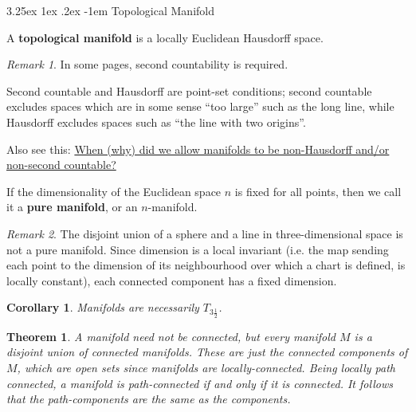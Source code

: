\documentclass[12pt, letterpaper]{article}
\makeatletter
\newtheorem{cor}[prop]{Corollary}
\newtheorem{thm}[prop]{Theorem}
\renewcommand\paragraph{\@startsection{paragraph}{4}{\z@}%
	{3.25ex \@plus1ex \@minus.2ex}%
	{-1em}%
	{\normalfont\normalsize\bfseries}}
\theoremstyle{definition}
\theoremstyle{remark}
\newtheorem*{rem*}{Remark}
\theoremstyle{definition}
\theoremstyle{plain}
\numberwithin{equation}{section}
\makeatother
\begin{document}
	\paragraph{Topological Manifold}
	\begin{def*}
		A \textbf{topological manifold} is a locally Euclidean Hausdorff space. 
	\end{def*}
	\begin{rem*}
		In some pages, second countability is required.
		
		Second countable and Hausdorff are point-set conditions;
		second countable excludes spaces which are in some sense ``too large'' such as the long line,
		while Hausdorff excludes spaces such as ``the line with two origins''.
		
		Also see this:
		\href{https://mathoverflow.net/questions/362154/when-why-did-we-allow-manifolds-to-be-non-hausdorff-and-or-non-second-countabl}{When (why) did we allow manifolds to be non-Hausdorff and/or non-second countable?}
	\end{rem*}

	
	\begin{def*}
		If the dimensionality of the Euclidean space $n$ is fixed for all points,
		then we call it a \textbf{pure manifold}, or an $n$-manifold.
	\end{def*}
	\begin{rem*}
		The disjoint union of a sphere and a line in three-dimensional space is not a pure manifold.
		Since dimension is a local invariant (i.e. the map sending each point to the dimension of its neighbourhood over which a chart is defined, is locally constant), each connected component has a fixed dimension.
	\end{rem*}

	\begin{cor}
		Manifolds are necessarily $T_{3\frac{1}{2}}$.
	\end{cor}

	\begin{thm}
		A manifold need not be connected, but every manifold $M$ is a disjoint union of connected manifolds.
		These are just the connected components of $M$, which are open sets since manifolds are locally-connected.
		Being locally path connected, a manifold is path-connected if and only if it is connected.
		It follows that the path-components are the same as the components.
	\end{thm}
\end{document}
